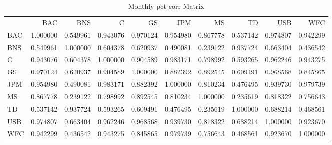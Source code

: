 \documentclass{article}
\begin{document}
\begin{table}
\caption{Monthly pct corr Matrix}
\label{tab:monthly_pct_corr}
\begin{tabular}{lrrrrrrrrr}
 & BAC & BNS & C & GS & JPM & MS & TD & USB & WFC \\
BAC & 1.000000 & 0.549961 & 0.943076 & 0.970124 & 0.954980 & 0.867778 & 0.537142 & 0.974807 & 0.942299 \\
BNS & 0.549961 & 1.000000 & 0.604378 & 0.620937 & 0.490081 & 0.239122 & 0.937724 & 0.663404 & 0.436542 \\
C & 0.943076 & 0.604378 & 1.000000 & 0.904589 & 0.983171 & 0.798992 & 0.593265 & 0.962246 & 0.943275 \\
GS & 0.970124 & 0.620937 & 0.904589 & 1.000000 & 0.882392 & 0.892545 & 0.609491 & 0.968568 & 0.845865 \\
JPM & 0.954980 & 0.490081 & 0.983171 & 0.882392 & 1.000000 & 0.810234 & 0.476495 & 0.939730 & 0.979739 \\
MS & 0.867778 & 0.239122 & 0.798992 & 0.892545 & 0.810234 & 1.000000 & 0.235619 & 0.818322 & 0.756643 \\
TD & 0.537142 & 0.937724 & 0.593265 & 0.609491 & 0.476495 & 0.235619 & 1.000000 & 0.688214 & 0.468561 \\
USB & 0.974807 & 0.663404 & 0.962246 & 0.968568 & 0.939730 & 0.818322 & 0.688214 & 1.000000 & 0.923670 \\
WFC & 0.942299 & 0.436542 & 0.943275 & 0.845865 & 0.979739 & 0.756643 & 0.468561 & 0.923670 & 1.000000 \\
\end{tabular}
\end{table}
\end{document}
